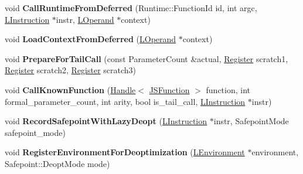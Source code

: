\begin{DoxyCompactItemize}
\item 
void {\bfseries Call\+Runtime\+From\+Deferred} (Runtime\+::\+Function\+Id id, int argc, \hyperlink{classv8_1_1internal_1_1_l_instruction}{L\+Instruction} $\ast$instr, \hyperlink{classv8_1_1internal_1_1_l_operand}{L\+Operand} $\ast$context)\hypertarget{classv8_1_1internal_1_1_l_code_gen_a4c3be7c7de6a86615c912e70cfc04ab4}{}\label{classv8_1_1internal_1_1_l_code_gen_a4c3be7c7de6a86615c912e70cfc04ab4}

\item 
void {\bfseries Load\+Context\+From\+Deferred} (\hyperlink{classv8_1_1internal_1_1_l_operand}{L\+Operand} $\ast$context)\hypertarget{classv8_1_1internal_1_1_l_code_gen_a9009104c76636c80f382e04c1dd304ca}{}\label{classv8_1_1internal_1_1_l_code_gen_a9009104c76636c80f382e04c1dd304ca}

\item 
void {\bfseries Prepare\+For\+Tail\+Call} (const Parameter\+Count \&actual, \hyperlink{structv8_1_1internal_1_1_register}{Register} scratch1, \hyperlink{structv8_1_1internal_1_1_register}{Register} scratch2, \hyperlink{structv8_1_1internal_1_1_register}{Register} scratch3)\hypertarget{classv8_1_1internal_1_1_l_code_gen_ac244b5f30d2995d51f6d263358a7ccd9}{}\label{classv8_1_1internal_1_1_l_code_gen_ac244b5f30d2995d51f6d263358a7ccd9}

\item 
void {\bfseries Call\+Known\+Function} (\hyperlink{classv8_1_1internal_1_1_handle}{Handle}$<$ \hyperlink{classv8_1_1internal_1_1_j_s_function}{J\+S\+Function} $>$ function, int formal\+\_\+parameter\+\_\+count, int arity, bool is\+\_\+tail\+\_\+call, \hyperlink{classv8_1_1internal_1_1_l_instruction}{L\+Instruction} $\ast$instr)\hypertarget{classv8_1_1internal_1_1_l_code_gen_adec87ca608c3363d2fa40b37952378b9}{}\label{classv8_1_1internal_1_1_l_code_gen_adec87ca608c3363d2fa40b37952378b9}

\item 
void {\bfseries Record\+Safepoint\+With\+Lazy\+Deopt} (\hyperlink{classv8_1_1internal_1_1_l_instruction}{L\+Instruction} $\ast$instr, Safepoint\+Mode safepoint\+\_\+mode)\hypertarget{classv8_1_1internal_1_1_l_code_gen_ae96e1ea2617dfdd8a23b554d85bdd250}{}\label{classv8_1_1internal_1_1_l_code_gen_ae96e1ea2617dfdd8a23b554d85bdd250}

\item 
void {\bfseries Register\+Environment\+For\+Deoptimization} (\hyperlink{classv8_1_1internal_1_1_l_environment}{L\+Environment} $\ast$environment, Safepoint\+::\+Deopt\+Mode mode)\hypertarget{classv8_1_1internal_1_1_l_code_gen_a8e3566b9bf7194223c47e7dac6fd6a10}{}\label{classv8_1_1internal_1_1_l_code_gen_a8e3566b9bf7194223c47e7dac6fd6a10}


\end{DoxyCompactItemize}
